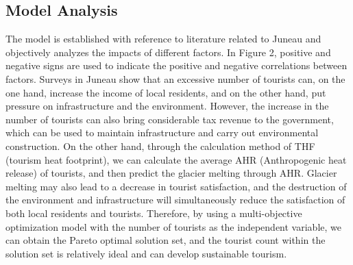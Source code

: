 \documentclass[12pt]{article}  %
\begin{document}
 \subsection{Model Analysis}
 The model is established with reference to literature related to Juneau and objectively analyzes the impacts of different factors. In Figure 2, positive and negative signs are used to indicate the positive and negative correlations between factors. Surveys in Juneau show that an excessive number of tourists can, on the one hand, increase the income of local residents, and on the other hand, put pressure on infrastructure and the environment. However, the increase in the number of tourists can also bring considerable tax revenue to the government, which can be used to maintain infrastructure and carry out environmental construction. On the other hand, through the calculation method of THF (tourism heat footprint), we can calculate the average AHR (Anthropogenic heat release) of tourists, and then predict the glacier melting through AHR. Glacier melting may also lead to a decrease in tourist satisfaction, and the destruction of the environment and infrastructure will simultaneously reduce the satisfaction of both local residents and tourists. Therefore, by using a multi-objective optimization model with the number of tourists as the independent variable, we can obtain the Pareto optimal solution set, and the tourist count within the solution set is relatively ideal and can develop sustainable tourism.
\end{document}
